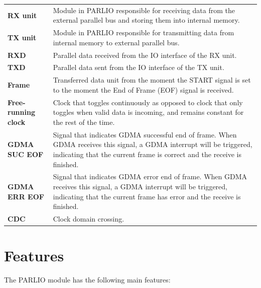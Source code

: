 \documentclass[main\_\_EN.tex]{subfiles}
\begin{document}
\begin{longtable}[c]{ R{4cm} p{10cm} }
\textbf{RX unit}            & Module in PARLIO responsible for receiving data from the external parallel bus and storing them into internal memory. \\
\textbf{TX unit}            & Module in PARLIO responsible for transmitting data from internal memory to external parallel bus. \\
\textbf{RXD}                & Parallel data received from the IO interface of the RX unit. \\
\textbf{TXD}                & Parallel data sent from the IO interface of the TX unit. \\
\textbf{Frame}              & Transferred data unit from the moment the START signal is set to the moment the End of Frame (EOF) signal is received. \\
\textbf{Free-running clock} & Clock that toggles continuously as opposed to clock that only toggles when valid data is incoming, and remains constant for the rest of the time.\\
\textbf{GDMA SUC EOF}       & Signal that indicates GDMA successful end of frame. When GDMA receives this signal, a GDMA interrupt will be triggered, indicating that the current frame is correct and the receive is finished.\\
\textbf{GDMA ERR EOF}       & Signal that indicates GDMA error end of frame. When GDMA receives this signal, a GDMA interrupt will be triggered, indicating that the current frame has error and the receive is finished.\\
\textbf{CDC}                & Clock domain crossing.\\

\end{longtable}




\section{Features}
\label{sec:parlio-features}

The PARLIO module has the following main features:
\end{document}
